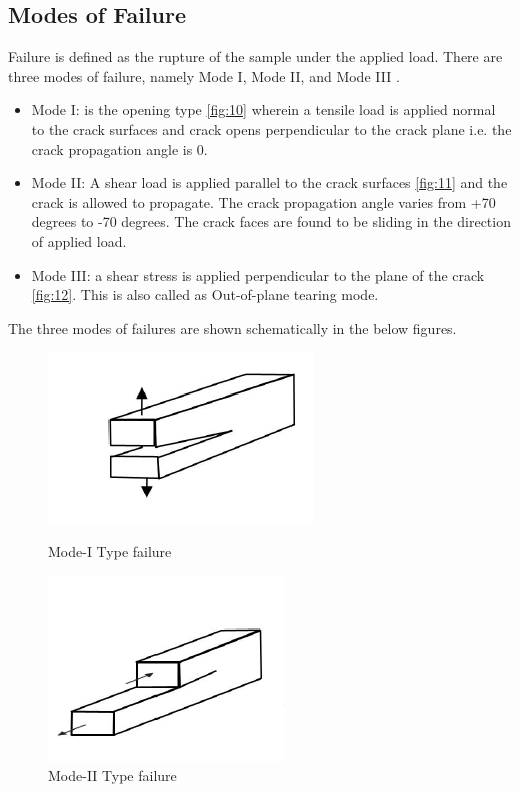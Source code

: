 \documentclass[fleqn, 12.5pt,a4paper]{report}
\begin{document}
\subsection{Modes of Failure}
Failure is defined as the rupture of the sample under the applied load. There are three modes of failure, namely Mode I, Mode II, and Mode III \cite{kuna2013finite}.
\begin{itemize}
    \item Mode I: is the opening type \autoref{fig:10} wherein a tensile load is applied normal to the crack surfaces and crack opens perpendicular to the crack plane i.e. the crack propagation angle is 0.
    \item Mode II: A shear load is applied parallel to the crack surfaces \autoref{fig:11} and the crack is allowed to propagate. The crack propagation angle varies from +70 degrees to -70 degrees. The crack faces are found to be sliding in the direction of applied load.
    \item Mode III: a shear stress is applied perpendicular to the plane of the crack \autoref{fig:12}. This is also called as Out-of-plane tearing mode.
\end{itemize}
The three modes of failures are shown schematically in the below figures.

\begin{figure}[H]
  \begin{minipage}[b]{0.4\textwidth}
    \includegraphics[scale = 0.8]{M1.png}
    \caption{{Mode-I Type failure \cite{kuna2013finite}}}
    \label{fig:10}
  \end{minipage}
  \hspace{2cm}
  \begin{minipage}[b]{0.4\textwidth}
    \includegraphics[scale = 0.8]{M2.png}
    \caption{{Mode-II Type failure \cite{kuna2013finite}}}
    \label{fig:11}
  \end{minipage}
\end{figure}
\end{document}
